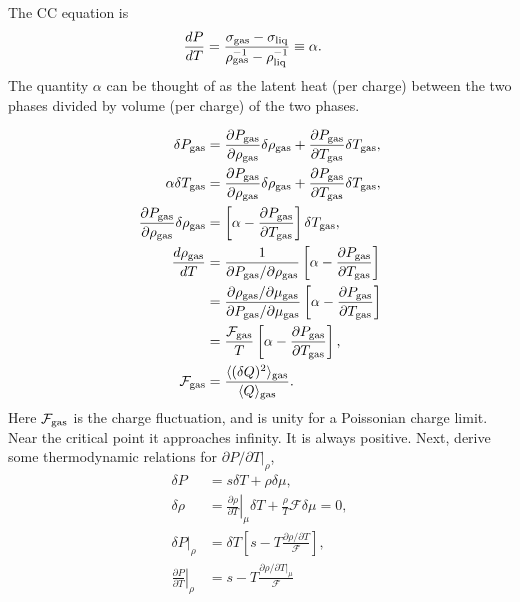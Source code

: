 \documentclass[12pt]{article}
\numberwithin{equation}{section}
\numberwithin{figure}{section}
\begin{document}
The CC equation is
\begin{align*}
\frac{dP}{dT}&=\frac{\sigma_{\rm gas}-\sigma_{\rm liq}}{\rho^{-1}_{\rm gas}-\rho^{-1}_{\rm liq}}\equiv \alpha.
\end{align*}
The quantity $\alpha$ can be thought of as the latent heat (per charge) between the two phases divided by volume (per charge) of the two phases.

\begin{align*}
\delta P_{\rm gas}&=\frac{\partial P_{\rm gas}}{\partial\rho_{\rm gas}}\delta \rho_{\rm gas}+\frac{\partial P_{\rm gas}}{\partial T_{\rm gas}}\delta T_{\rm gas},\\
\alpha\delta T_{\rm gas}&=\frac{\partial P_{\rm gas}}{\partial\rho_{\rm gas}}\delta \rho_{\rm gas}+\frac{\partial P_{\rm gas}}{\partial T_{\rm gas}}\delta T_{\rm gas},\\
\frac{\partial P_{\rm gas}}{\partial\rho_{\rm gas}}\delta\rho_{\rm gas}&=\left[\alpha-\frac{\partial P_{\rm gas}}{\partial T_{\rm gas}}\right]\delta T_{\rm gas},\\
\frac{d\rho_{\rm gas}}{dT}&=\frac{1}{\partial P_{\rm gas}/{\partial\rho_{\rm gas}}}
\left[\alpha-\frac{\partial P_{\rm gas}}{\partial T_{\rm gas}}\right]\\
&=\frac{\partial \rho_{\rm gas}/\partial\mu_{\rm gas}}{\partial P_{\rm gas}/{\partial\mu_{\rm gas}}}
\left[\alpha-\frac{\partial P_{\rm gas}}{\partial T_{\rm gas}}\right]\\
&=\frac{\mathcal{F}_{\rm gas}}{T}\left[\alpha-\frac{\partial P_{\rm gas}}{\partial T_{\rm gas}}\right],\\
\mathcal{F}_{\rm gas}&=\frac{\langle(\delta Q)^2\rangle_{\rm gas}}{\langle Q\rangle_{\rm gas}}.
\end{align*}
Here $\mathcal{F}_{\rm gas}$ is the charge fluctuation, and is unity for a Poissonian charge limit. Near the critical point it approaches infinity. It is always positive. 
Next, derive some thermodynamic relations for $\partial P/\partial T|_\rho$,
\begin{align*}
\delta P&=s\delta T +\rho\delta\mu,\\
\delta\rho&=\left.\frac{\partial\rho}{\partial T}\right|_\mu\delta T+\frac{\rho}{T}\mathcal{F}\delta \mu=0,\\
\delta P|_\rho&=\delta T\left[s-T\frac{\partial\rho/\partial T}{\mathcal{F}}\right],\\
\left.\frac{\partial P}{\partial T}\right|_\rho&=s-T\frac{\partial\rho/\partial T|_\mu}{\mathcal{F}}
\end{align*}
\end{document}
